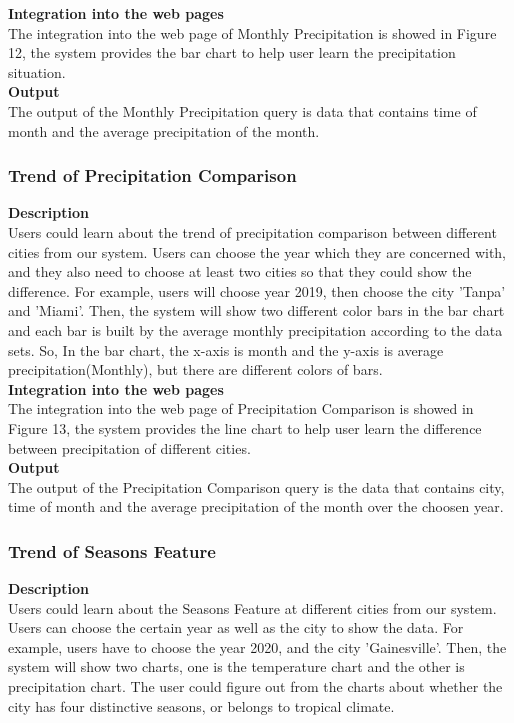 \documentclass[]{article}
\begin{document}
	\noindent \textbf{Integration into the web pages} \\
	\noindent The integration into the web page of Monthly Precipitation is showed in Figure 12, the system provides the bar chart to help user learn the precipitation situation.    \\
	
	\noindent \textbf{Output} \\
	\noindent The output of the Monthly Precipitation query is data that contains time of month and the average precipitation of the month. 
	
	\subsubsection{Trend of Precipitation Comparison}
	
	\textbf{Description} \\
	\noindent Users could learn about the trend of precipitation comparison between different cities from our system. Users can choose the year which they are concerned with, and they also need to choose at least two cities so that they could show the difference. For example, users will choose year 2019, then choose the city 'Tanpa' and 'Miami'. Then, the system will show two different color bars in the bar chart and each bar is built by the average monthly precipitation according to the data sets. So, In the bar chart, the x-axis is month and the y-axis is average precipitation(Monthly), but there are different colors of bars.    \\
	
	\noindent \textbf{Integration into the web pages} \\
	\noindent The integration into the web page of Precipitation Comparison is showed in Figure 13, the system provides the line chart to help user learn the difference between precipitation of different cities.    \\
	
	\noindent \textbf{Output} \\
	\noindent The output of the Precipitation Comparison query is the data that contains city, time of month and the average precipitation of the month over the choosen year.  
	
	\subsubsection{Trend of Seasons Feature}
	
	\textbf{Description} \\
	\noindent Users could learn about the Seasons Feature at different cities from our system. Users can choose the certain year as well as the city to show the data. For example, users have to choose the year 2020, and the city 'Gainesville'. Then, the system will show two charts, one is the temperature chart and the other is precipitation chart. The user could figure out from the charts about whether the city has four distinctive seasons, or belongs to tropical climate.     \\
	
\end{document}

